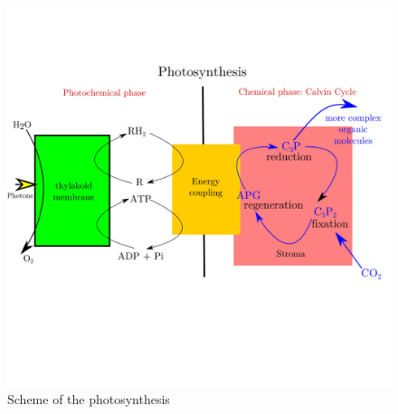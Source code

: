 \documentclass[draft, final]{report}
\begin{document}
\begin{itemize}
  \begin{figure}[!ht]
    \centering
    \includegraphics[trim= 0 0 0 50, clip=true, scale=0.5]{LateX/Images/photosynthesisscheme.png}
    \caption{Scheme of the photosynthesis\cite{Photosynthesis}}
  \end{figure}
  \clearpage


\end{itemize}
\end{document}
